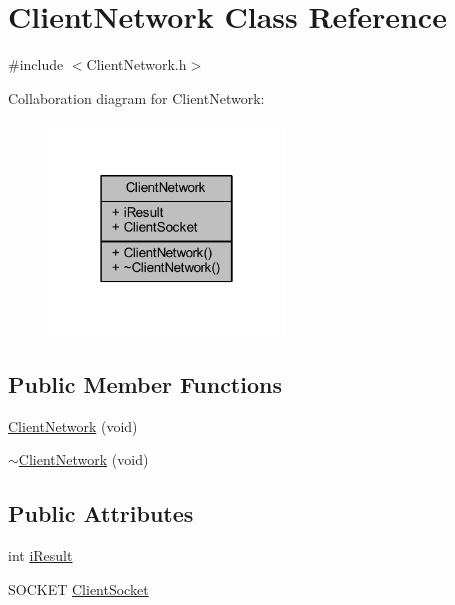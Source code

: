 \hypertarget{class_client_network}{}\section{Client\+Network Class Reference}
\label{class_client_network}


{\ttfamily \#include $<$Client\+Network.\+h$>$}



Collaboration diagram for Client\+Network\+:
\nopagebreak
\begin{figure}[H]
\begin{center}
\leavevmode
\includegraphics[width=178pt]{class_client_network__coll__graph}
\end{center}
\end{figure}
\subsection*{Public Member Functions}
\begin{DoxyCompactItemize}
\item 
\mbox{\hyperlink{class_client_network_a22c4fa85099f8e20657cb40e9ba6cb6f}{Client\+Network}} (void)
\item 
\mbox{\hyperlink{class_client_network_a5a9041029d317343e844a54e2cc1edd4}{$\sim$\+Client\+Network}} (void)
\end{DoxyCompactItemize}
\subsection*{Public Attributes}
\begin{DoxyCompactItemize}
\item 
int \mbox{\hyperlink{class_client_network_abd41d3abe0a3816b17c1f7f2f7954791}{i\+Result}}
\item 
S\+O\+C\+K\+ET \mbox{\hyperlink{class_client_network_a350f1d28c591829adedb9b9f08bc4d4b}{Client\+Socket}}
\end{DoxyCompactItemize}


